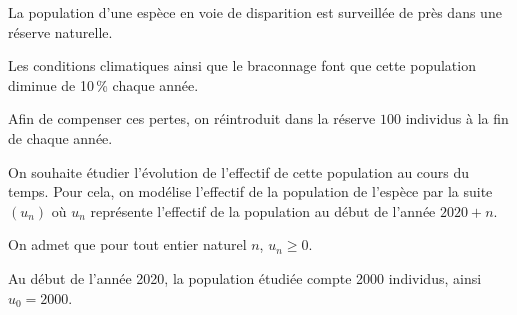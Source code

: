 La population d'une espèce en voie de disparition est surveillée de près dans une réserve naturelle.

Les conditions climatiques ainsi que le braconnage font que cette population diminue de 10\,\% chaque année.

Afin de compenser ces pertes, on réintroduit dans la réserve $100$ individus à la fin de chaque année.

On souhaite étudier l'évolution de l'effectif de cette population au cours du temps. Pour cela, on modélise l'effectif de la population de l'espèce par la suite $\left(u_n\right)$ où $u_n$ représente l'effectif de la population au début de l'année $2020 + n$. 

On admet que pour tout entier naturel $n$, $u_n \geqslant 0$.

Au début de l'année 2020, la population étudiée compte \num{2000} individus, ainsi $u_0 = \num{2000}$.

